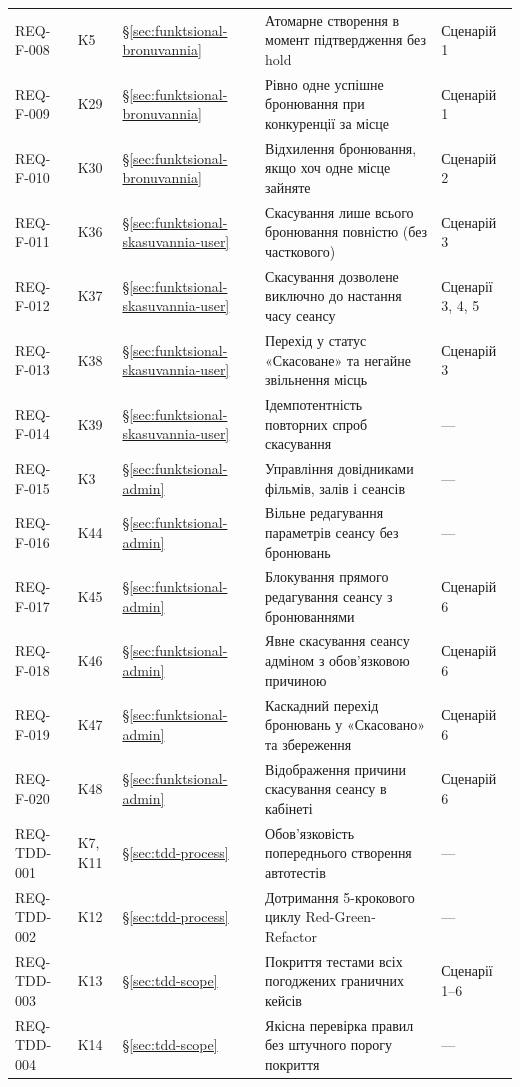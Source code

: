 \begin{small}
\begin{longtable}{@{}p{2.2cm} p{1.4cm} p{1.6cm} p{7.4cm} p{2.4cm}@{}}
REQ-F-008 & K5 & \S\ref{sec:funktsional-bronuvannia} & Атомарне створення в момент підтвердження без hold & Сценарій 1 \\
REQ-F-009 & K29 & \S\ref{sec:funktsional-bronuvannia} & Рівно одне успішне бронювання при конкуренції за місце & Сценарій 1 \\
REQ-F-010 & K30 & \S\ref{sec:funktsional-bronuvannia} & Відхилення бронювання, якщо хоч одне місце зайняте & Сценарій 2 \\
REQ-F-011 & K36 & \S\ref{sec:funktsional-skasuvannia-user} & Скасування лише всього бронювання повністю (без часткового) & Сценарій 3 \\
REQ-F-012 & K37 & \S\ref{sec:funktsional-skasuvannia-user} & Скасування дозволене виключно до настання часу сеансу & Сценарії 3, 4, 5 \\
REQ-F-013 & K38 & \S\ref{sec:funktsional-skasuvannia-user} & Перехід у статус «Скасоване» та негайне звільнення місць & Сценарій 3 \\
REQ-F-014 & K39 & \S\ref{sec:funktsional-skasuvannia-user} & Ідемпотентність повторних спроб скасування & --- \\
REQ-F-015 & K3 & \S\ref{sec:funktsional-admin} & Управління довідниками фільмів, залів і сеансів & --- \\
REQ-F-016 & K44 & \S\ref{sec:funktsional-admin} & Вільне редагування параметрів сеансу без бронювань & --- \\
REQ-F-017 & K45 & \S\ref{sec:funktsional-admin} & Блокування прямого редагування сеансу з бронюваннями & Сценарій 6 \\
REQ-F-018 & K46 & \S\ref{sec:funktsional-admin} & Явне скасування сеансу адміном з обов'язковою причиною & Сценарій 6 \\
REQ-F-019 & K47 & \S\ref{sec:funktsional-admin} & Каскадний перехід бронювань у «Скасовано» та збереження & Сценарій 6 \\
REQ-F-020 & K48 & \S\ref{sec:funktsional-admin} & Відображення причини скасування сеансу в кабінеті & Сценарій 6 \\
REQ-TDD-001 & K7, K11 & \S\ref{sec:tdd-process} & Обов'язковість попереднього створення автотестів & --- \\
REQ-TDD-002 & K12 & \S\ref{sec:tdd-process} & Дотримання 5-крокового циклу Red-Green-Refactor & --- \\
REQ-TDD-003 & K13 & \S\ref{sec:tdd-scope} & Покриття тестами всіх погоджених граничних кейсів & Сценарії 1--6 \\
REQ-TDD-004 & K14 & \S\ref{sec:tdd-scope} & Якісна перевірка правил без штучного порогу покриття & --- \\

\end{longtable}
\end{small}
